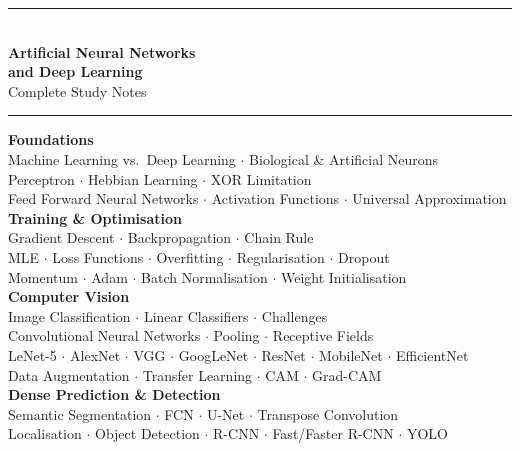 \documentclass[11pt,a4paper]{article}
\begin{document}

\begin{titlepage}
\centering\vspace*{3cm}
{\color{PrimaryBlue}\rule{\linewidth}{2pt}}\\[0.6em]
{\Huge\bfseries\color{PrimaryBlue} Artificial Neural Networks}\\[0.3em]
{\Huge\bfseries\color{PrimaryBlue} and Deep Learning}\\[0.4em]
{\Large\color{SubsectionColor} Complete Study Notes}\\[0.3em]
{\color{PrimaryBlue}\rule{\linewidth}{2pt}}\vspace{1.2cm}
\begin{tcolorbox}[colback=LightBlue,colframe=AccentBlue,width=0.88\textwidth,boxrule=1pt,arc=4pt]
\centering\normalsize\color{NoteGray}
\textbf{Foundations}\\
Machine Learning vs.\ Deep Learning $\cdot$ Biological \& Artificial Neurons\\
Perceptron $\cdot$ Hebbian Learning $\cdot$ XOR Limitation\\
Feed Forward Neural Networks $\cdot$ Activation Functions $\cdot$ Universal Approximation\\[0.5em]
\textbf{Training \& Optimisation}\\
Gradient Descent $\cdot$ Backpropagation $\cdot$ Chain Rule\\
MLE $\cdot$ Loss Functions $\cdot$ Overfitting $\cdot$ Regularisation $\cdot$ Dropout\\
Momentum $\cdot$ Adam $\cdot$ Batch Normalisation $\cdot$ Weight Initialisation\\[0.5em]
\textbf{Computer Vision}\\
Image Classification $\cdot$ Linear Classifiers $\cdot$ Challenges\\
Convolutional Neural Networks $\cdot$ Pooling $\cdot$ Receptive Fields\\
LeNet-5 $\cdot$ AlexNet $\cdot$ VGG $\cdot$ GoogLeNet $\cdot$ ResNet $\cdot$ MobileNet $\cdot$ EfficientNet\\
Data Augmentation $\cdot$ Transfer Learning $\cdot$ CAM $\cdot$ Grad-CAM\\[0.5em]
\textbf{Dense Prediction \& Detection}\\
Semantic Segmentation $\cdot$ FCN $\cdot$ U-Net $\cdot$ Transpose Convolution\\
Localisation $\cdot$ Object Detection $\cdot$ R-CNN $\cdot$ Fast/Faster R-CNN $\cdot$ YOLO\\

\end{tcolorbox}
\end{titlepage}
\end{document}
